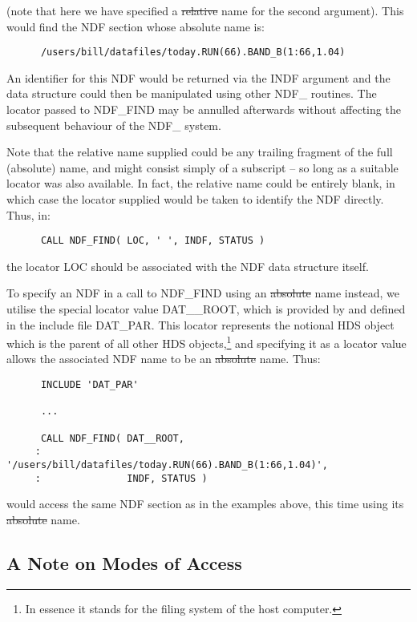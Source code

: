 (note that here we have specified a \st{relative\/} name for the second
argument). This would find the NDF section whose absolute name is:

\small
\begin{verbatim}
      /users/bill/datafiles/today.RUN(66).BAND_B(1:66,1.04)
\end{verbatim}
\normalsize

An identifier for this NDF would be returned via the INDF argument and
the data structure could then be manipulated using other NDF\_
routines.  The locator passed to NDF\_FIND may be annulled afterwards
without affecting the subsequent behaviour of the NDF\_ system.

Note that the relative name supplied could be any trailing fragment of
the full (absolute) name, and might consist simply of a subscript --
so long as a suitable locator was also available. In fact, the
relative name could be entirely blank, in which case the locator
supplied would be taken to identify the NDF directly. Thus, in:

\small
\begin{verbatim}
      CALL NDF_FIND( LOC, ' ', INDF, STATUS )
\end{verbatim}
\normalsize

the locator LOC should be associated with the NDF data structure
itself.

To specify an NDF in a call to NDF\_FIND using an \st{absolute\/}
name instead, we utilise the special locator value DAT\_\_ROOT, which
is provided by  and defined in the include file
DAT\_PAR. This locator represents the notional HDS object which is the
parent of all other HDS objects,\footnote{In essence it stands for the
filing system of the host computer.} and specifying it as a locator
value allows the associated NDF name to be an \st{absolute\/}
name. Thus:

\small
\begin{verbatim}
      INCLUDE 'DAT_PAR'

      ...

      CALL NDF_FIND( DAT__ROOT,
     :               '/users/bill/datafiles/today.RUN(66).BAND_B(1:66,1.04)',
     :               INDF, STATUS )
\end{verbatim}
\normalsize

would access the same NDF section as in the examples above, this time
using its \st{absolute\/} name.

\subsection{A Note on Modes of Access}

